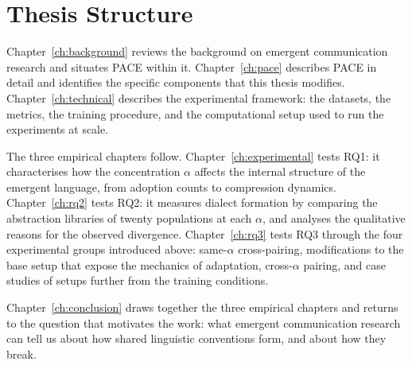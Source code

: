 \section{Thesis Structure}
\label{sec:intro-thesis-structure}

Chapter~\ref{ch:background} reviews the background on emergent communication research and situates PACE within it. Chapter~\ref{ch:pace} describes PACE in detail and identifies the specific components that this thesis modifies. Chapter~\ref{ch:technical} describes the experimental framework: the datasets, the metrics, the training procedure, and the computational setup used to run the experiments at scale.

The three empirical chapters follow. Chapter~\ref{ch:experimental} tests RQ1: it characterises how the concentration $\alpha$ affects the internal structure of the emergent language, from adoption counts to compression dynamics. Chapter~\ref{ch:rq2} tests RQ2: it measures dialect formation by comparing the abstraction libraries of twenty populations at each $\alpha$, and analyses the qualitative reasons for the observed divergence. Chapter~\ref{ch:rq3} tests RQ3 through the four experimental groups introduced above: same-$\alpha$ cross-pairing, modifications to the base setup that expose the mechanics of adaptation, cross-$\alpha$ pairing, and case studies of setups further from the training conditions.

Chapter~\ref{ch:conclusion} draws together the three empirical chapters and returns to the question that motivates the work: what emergent communication research can tell us about how shared linguistic conventions form, and about how they break.